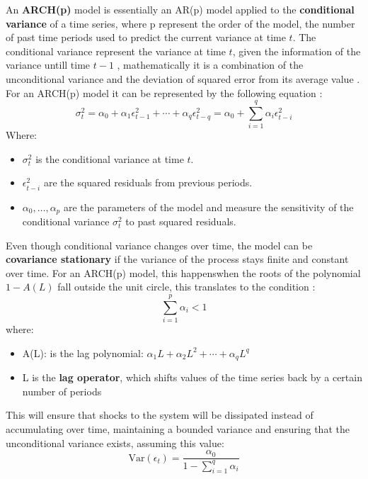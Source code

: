 An \textbf{ARCH(p)} model is essentially an AR(p) model applied to the \textbf{conditional variance} of a time series, where p represent the order of the model, the number of past time periods used to predict the current variance at time \(t\). The conditional variance represent the variance at time \(t\), given the information of the variance untill time \(t-1\) , mathematically it is a combination of the unconditional variance and the deviation of squared error from its average value . For an ARCH(p) model it  can be represented by the following equation \cite{PalombaGARCH}: 
\begin{equation}
\displaystyle \sigma _{t}^{2}=\alpha _{0}+\alpha _{1}\epsilon _{t-1}^{2}+\cdots +\alpha _{q}\epsilon _{t-q}^{2}=\alpha _{0}+\sum _{i=1}^{q}\alpha _{i}\epsilon _{t-i}^{2}
\end{equation} 
Where:
\begin{itemize}
    \item $\sigma_{t}^{2}$ is the conditional variance at time $t$.
    \item $\epsilon _{t-i}^{2}$ are the squared residuals from previous periods.
    \item $\alpha_{0}, \dots, \alpha_{p}$ are the parameters of the model and measure the sensitivity of the conditional variance $\sigma_{t}^{2}$ to past squared residuals.
\end{itemize}

Even though conditional variance changes over time, the model can be \textbf{covariance stationary} if the variance of the process stays finite and constant over time. For an ARCH(p) model, this happenswhen the roots of the polynomial $1-A(L)$ fall outside the unit circle, this translates to the condition \cite{PalombaGARCH}: 
\begin{equation}
\sum_{i=1}^{p} \alpha_{i} < 1
\end{equation} 
where:
\begin{itemize}
    \item A(L): is the lag polynomial: \(\alpha_1 L + \alpha_2 L^2 + \cdots + \alpha_q L^q\) 
    \item L is the \textbf{lag operator}, which shifts values of the time series back by a certain number of periods 
\end{itemize}

This will ensure that shocks to the system will be dissipated instead of accumulating over time, maintaining a bounded variance and ensuring that the unconditional variance exists, assuming this value: 
\begin{equation}
\text{Var}(\epsilon_t) = \frac{\alpha _{0}}{1 - \sum_{i=1}^{q} \alpha_i}
\end{equation} 


